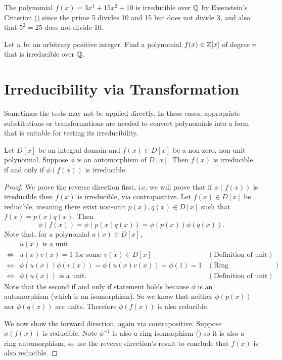 \begin{example}
    The polynomial $f(x) = 3x^4 + 15x^2 + 10$ is irreducible over $\mathbb{Q}$ by Eisenstein's Criterion () since the prime 5 divides 10 and 15 but does not divide 3, and also that $5^2 = 25$ does not divide 10.
\end{example}

\begin{exercise}
    Let $n$ be an arbitrary positive integer. Find a polynomial $f(x) \in \mathbb{Z}[x]$ of degree $n$ that is irreducible over $\mathbb{Q}$.
\end{exercise}

\section{Irreducibility via Transformation}
Sometimes the tests may not be applied directly. In these cases, appropriate substitutions or transformations are needed to convert polynomials into a form that is suitable for testing its irreducibility.

\begin{theorem}\label{thrm-transformation-rule-for-irreducibility}
    Let $D[x]$ be an integral domain and $f(x) \in D[x]$ be a non-zero, non-unit polynomial. Suppose $\phi$ is an automorphism of $D[x]$. Then $f(x)$ is irreducible if and only if $\phi(f(x))$ is irreducible.
\end{theorem}
\begin{proof}
    We prove the reverse direction first, i.e. we will prove that if $\phi(f(x))$ is irreducible then $f(x)$ is irreducible, via contrapositive. Let $f(x) \in D[x]$ be reducible, meaning there exist non-unit $p(x), q(x) \in D[x]$ such that $f(x) = p(x)q(x)$. Then
    \[
        \phi(f(x)) = \phi(p(x)q(x)) = \phi(p(x))\phi(q(x)).
    \]
    Note that, for a polynomial $u(x) \in D[x]$,
    \begin{align*}
        &u(x) \text{ is a unit}\\
        \iff&u(x)v(x) = 1 \text{ for some }v(x) \in D[x] & (\text{Definition of unit})\\
        \iff&\phi(u(x))\phi(v(x))  = \phi(u(x)v(x)) = \phi(1) = 1 & (\text{Ring homomorphism properties})\\
        \iff&\phi(u(x)) \text{ is a unit.} & (\text{Definition of unit})
    \end{align*}
    Note that the second if and only if statement holds because $\phi$ is an automorphism (which is an isomorphism). So we know that neither $\phi(p(x))$ nor $\phi(q(x))$ are units. Therefore $\phi(f(x))$ is also reducible.

    We now show the forward direction, again via contrapositive. Suppose $\phi(f(x))$ is reducible. Note $\phi^{-1}$ is also a ring isomorphism () so it is also a ring automorphism, so use the reverse direction's result to conclude that $f(x)$ is also reducible.
\end{proof}

